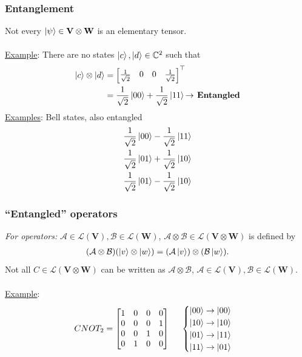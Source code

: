 \documentclass{beamer}
\theoremstyle{definition}
\newcommand{\V}{\mathbf{V}}
\newcommand{\W}{\mathbf{W}}
\newcommand{\A}{\mathcal{A}}
\newcommand{\B}{\mathcal{B}}
\newcommand{\lag}{\mathcal{L}}
\begin{document}
\begin{frame}
\frametitle{Entanglement}
Not every $\ket{\psi} \in \V\otimes \W$ is an elementary tensor.  \\
$\,$\\
\underline{Example}: There are no states $\left\vert{c}\right\rangle, \left\vert{d}\right\rangle \in \mathbb{C}^2$ such that
\begin{align*}
\left\vert{c}\right\rangle \otimes \left\vert{d}\right\rangle  &= \begin{bmatrix}
\frac{1}{\sqrt{2}} & 0 & 0 & \frac{1}{\sqrt{2}}
\end{bmatrix}^\top \\
&= \frac{1}{\sqrt{2}}\left\vert{00}\right\rangle + \frac{1}{\sqrt{2}}\left\vert{11}\right\rangle \textbf{$\rightarrow$ Entangled}
\end{align*}
\underline{Examples}: Bell states, also entangled \cite{Bell}
\begin{align*}
\frac{1}{\sqrt{2}}\left\vert{00}\right\rangle - \frac{1}{\sqrt{2}}\left\vert{11}\right\rangle\\
\frac{1}{\sqrt{2}}\left\vert{01}\right\rangle + \frac{1}{\sqrt{2}}\left\vert{10}\right\rangle\\
\frac{1}{\sqrt{2}}\left\vert{01}\right\rangle - \frac{1}{\sqrt{2}}\left\vert{10}\right\rangle\\
\end{align*}


\end{frame}

\begin{frame}
\frametitle{``Entangled'' operators}
\textit{For operators:} $\A \in \mathfrak{\lag}(\V), \mathcal{B} \in \mathfrak{\lag}(\W)$, $\A\otimes \B \in \mathfrak{\lag}(\V \otimes \W)$ is defined by
\begin{align*}
(\A \otimes \B)(\ket{v}\otimes \ket{w}) = (\A\ket{v})\otimes (\B\ket{w}).
\end{align*}
Not all $C \in \mathfrak{\lag}(\V\otimes \W)$ can be written as $\A \otimes \B$, $\A \in \mathfrak{\lag}(\V), \mathcal{B} \in \mathfrak{\lag}(\W)$.\\
$\,$\\
\underline{Example}:
\begin{align*}
CNOT_2 = \begin{bmatrix}
1&0&0&0\\
0&0&0&1\\
0&0&1&0\\
0&1&0&0
\end{bmatrix} \hspace{0.5cm}
\begin{cases}
\left\vert{00}\right\rangle \to \left\vert{00}\right\rangle\\
\left\vert{10}\right\rangle \to \left\vert{10}\right\rangle\\
\left\vert{01}\right\rangle \to \left\vert{11}\right\rangle\\
\left\vert{11}\right\rangle \to \left\vert{01}\right\rangle
\end{cases}
\end{align*}
\end{frame}
\end{document}
